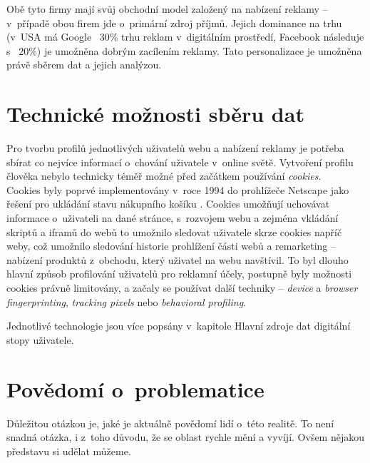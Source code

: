 Obě tyto firmy mají svůj obchodní model založený na nabízení reklamy -- v~případě obou firem jde o~primární zdroj příjmů. Jejich dominance na trhu (v~USA má Google ~30\% trhu reklam\citep{google-ads} v~digitálním prostředí, Facebook následuje s ~20\%) je umožněna dobrým zacílením reklamy. Tato personalizace je umožněna právě sběrem dat a jejich analýzou.



\section{Technické možnosti sběru dat}

Pro tvorbu profilů jednotlivých uživatelů webu a nabízení reklamy je potřeba sbírat co nejvíce informací o~chování uživatele v~online světě. Vytvoření profilu člověka nebylo technicky téměř možné před začátkem používání \textit{cookies}.\\
Cookies byly poprvé implementovány v~roce 1994 do prohlížeče Netscape jako řešení pro ukládání stavu nákupního košíku \citep{cookies-history}. Cookies umožňují uchovávat informace o~uživateli na dané stránce, s~rozvojem webu a zejména vkládání skriptů a iframů do webů to umožnilo sledovat uživatele skrze cookies napříč weby, což umožnilo sledování historie prohlížení části webů a remarketing -- nabízení produktů z~obchodu, který uživatel na webu navštívil\citep{scott-cookies}. To byl dlouho hlavní způsob profilování uživatelů pro reklamní účely, postupně byly možnosti cookies právně limitovány, a začaly se používat další techniky -- \textit{device} a \textit{browser fingerprinting}, \textit{tracking pixels} nebo \textit{behavioral profiling}.

Jednotlivé technologie jsou více popsány v~kapitole Hlavní zdroje dat digitální stopy uživatele.

\section{Povědomí o~problematice}

Důležitou otázkou je, jaké je aktuálně povědomí lidí o~této realitě. To není snadná otázka, i z~toho důvodu, že se oblast rychle mění a vyvíjí. Ovšem nějakou představu si udělat můžeme.

